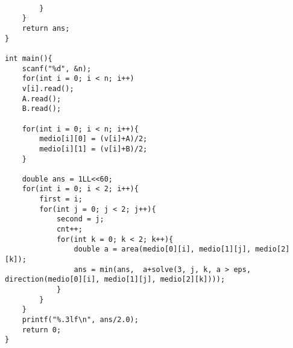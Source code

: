 \begin{multicols}{2}
\begin{lstlisting}
			
		}
	}
	return ans;
}

int main(){
	scanf("%d", &n);
	for(int i = 0; i < n; i++)
	v[i].read();
	A.read();
	B.read();
	
	for(int i = 0; i < n; i++){
		medio[i][0] = (v[i]+A)/2;
		medio[i][1] = (v[i]+B)/2;			
	}
	
	double ans = 1LL<<60;
	for(int i = 0; i < 2; i++){
		first = i;
		for(int j = 0; j < 2; j++){
			second = j;
			cnt++;
			for(int k = 0; k < 2; k++){
				double a = area(medio[0][i], medio[1][j], medio[2][k]);
				ans = min(ans,  a+solve(3, j, k, a > eps, direction(medio[0][i], medio[1][j], medio[2][k])));
			}
		}
	}
	printf("%.3lf\n", ans/2.0);
	return 0;
}
	\end{lstlisting}
\end{multicols}